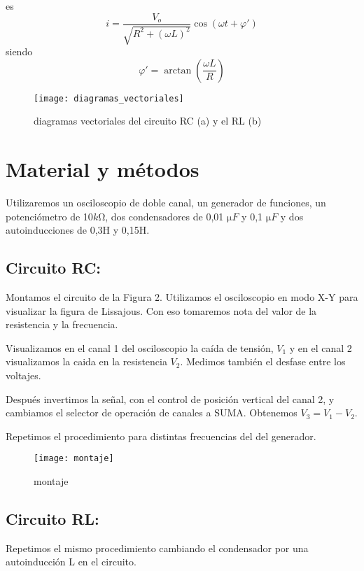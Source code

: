 \documentclass[a4paper,12pt,spanish]{article}
\begin{document}
es 
\[
i = \frac{V_o}{\sqrt{R^2 + (\omega L)^2}} \cos(\omega t + \varphi ')
\]
siendo 
\[\varphi ' = \arctan\left(\frac{\omega L}{R}\right)\]


\begin{figure}[H]
	\centering
	\texttt{[image: diagramas\_vectoriales]}
	\caption{diagramas vectoriales del circuito RC (a) y el RL (b)}
	\label{fig:diagramasvectoriales}
\end{figure}




\section{Material y métodos}

Utilizaremos un osciloscopio de doble canal, un generador de funciones, un potenciómetro de 10$\si{k\ohm}$, dos condensadores de 0,01 $\si{\micro F}$ y 0,1 $\si{\micro F}$ y dos autoinducciones de 0,3H y 0,15H.

\subsection*{Circuito RC:}

Montamos el circuito de la Figura 2. Utilizamos el osciloscopio en modo X-Y para visualizar la figura de Lissajous. Con eso tomaremos nota del valor de la resistencia y la frecuencia.

Visualizamos en el canal 1 del osciloscopio la caída de tensión, $V_1$ y en el canal 2 visualizamos la caida en la resistencia $V_2$. Medimos también el desfase entre los voltajes.

Después invertimos la señal, con el control de posición vertical del canal 2, y cambiamos el selector de operación de canales a SUMA. Obtenemos $V_3 = V_1 - V_2$.

Repetimos el procedimiento para distintas frecuencias del del generador.


\begin{figure}[H]
	\centering
	\texttt{[image: montaje]}
	\caption{montaje}
	\label{fig:montaje}
\end{figure}


\subsection*{Circuito RL:}

Repetimos el mismo procedimiento cambiando el condensador por una autoinducción L en el circuito.
\end{document}
